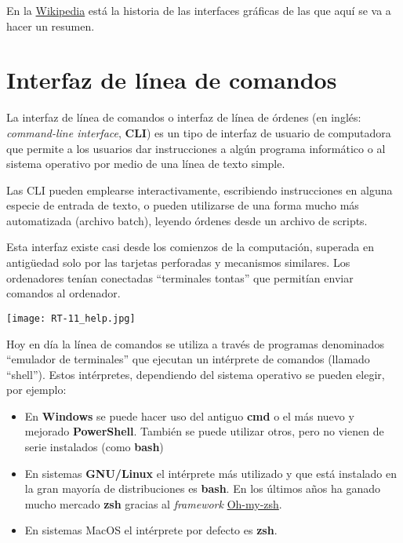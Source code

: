 En la \href{https://en.wikipedia.org/wiki/History_of_the_graphical_user_interface}{Wikipedia} está la historia de las interfaces gráficas de las que aquí se va a hacer un resumen.


\section{Interfaz de línea de comandos}

La interfaz de línea de comandos o interfaz de línea de órdenes (en inglés: \textit{command-line interface}, \textbf{CLI}) es un tipo de interfaz de usuario de computadora que permite a los usuarios dar instrucciones a algún programa informático o al sistema operativo por medio de una línea de texto simple.

Las CLI pueden emplearse interactivamente, escribiendo instrucciones en alguna especie de entrada de texto, o pueden utilizarse de una forma mucho más automatizada (archivo batch), leyendo órdenes desde un archivo de scripts.

Esta interfaz existe casi desde los comienzos de la computación, superada en antigüedad solo por las tarjetas perforadas y mecanismos similares. Los ordenadores tenían conectadas “terminales tontas” que permitían enviar comandos al ordenador.
\vspace{-10pt}
\begin{center}
    \texttt{[image: RT-11\_help.jpg]}
    \vspace{-10pt}
\end{center}

Hoy en día la línea de comandos se utiliza a través de programas denominados “emulador de terminales” que ejecutan un intérprete de comandos (llamado “shell”). Estos intérpretes, dependiendo del sistema operativo se pueden elegir, por ejemplo:

\begin{itemize}
    \item En \textbf{Windows} se puede hacer uso del antiguo \textbf{cmd} o el más nuevo y mejorado \textbf{PowerShell}. También se puede utilizar otros, pero no vienen de serie instalados (como \textbf{bash})
    \item En sistemas \textbf{GNU/Linux} el intérprete más utilizado y que está instalado en la gran mayoría de distribuciones es \textbf{bash}. En los últimos años ha ganado mucho mercado \textbf{zsh} gracias al \textit{framework} \href{https://ohmyz.sh/}{Oh-my-zsh}.

    \item En sistemas MacOS el intérprete por defecto es \textbf{zsh}.
\end{itemize}


